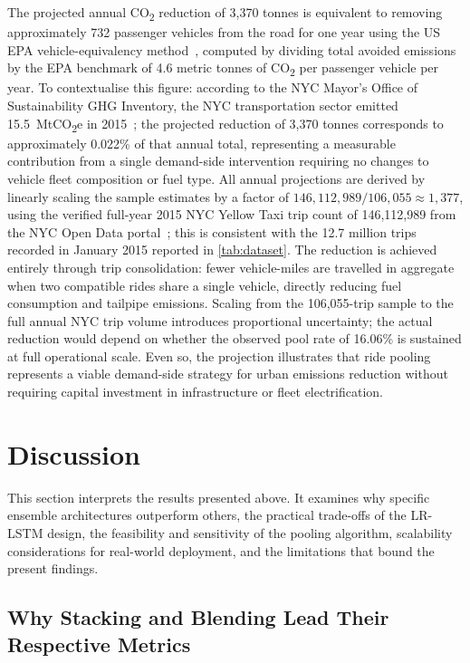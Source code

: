 The projected annual CO\textsubscript{2} reduction of 3,370 tonnes is equivalent to removing approximately 732 passenger vehicles from the road for one year using the US EPA vehicle-equivalency method~\parencite{epa_equivalencies}, computed by dividing total avoided emissions by the EPA benchmark of 4.6 metric tonnes of CO\textsubscript{2} per passenger vehicle per year. To contextualise this figure: according to the NYC Mayor's Office of Sustainability GHG Inventory, the NYC transportation sector emitted 15.5~MtCO\textsubscript{2}e in 2015~\parencite{nyc_ghg_2015}; the projected reduction of 3,370 tonnes corresponds to approximately 0.022\% of that annual total, representing a measurable contribution from a single demand-side intervention requiring no changes to vehicle fleet composition or fuel type. All annual projections are derived by linearly scaling the sample estimates by a factor of $146{,}112{,}989 / 106{,}055 \approx 1{,}377$, using the verified full-year 2015 NYC Yellow Taxi trip count of 146,112,989 from the NYC Open Data portal~\parencite{nyc_opendata_2015}; this is consistent with the 12.7 million trips recorded in January 2015 reported in \autoref{tab:dataset}. The reduction is achieved entirely through trip consolidation: fewer vehicle-miles are travelled in aggregate when two compatible rides share a single vehicle, directly reducing fuel consumption and tailpipe emissions. Scaling from the 106,055-trip sample to the full annual NYC trip volume introduces proportional uncertainty; the actual reduction would depend on whether the observed pool rate of 16.06\% is sustained at full operational scale. Even so, the projection illustrates that ride pooling represents a viable demand-side strategy for urban emissions reduction without requiring capital investment in infrastructure or fleet electrification.

\section{Discussion}
\label{sec:discussion}

This section interprets the results presented above. It examines why specific ensemble architectures outperform others, the practical trade-offs of the LR-LSTM design, the feasibility and sensitivity of the pooling algorithm, scalability considerations for real-world deployment, and the limitations that bound the present findings.

\subsection{Why Stacking and Blending Lead Their Respective Metrics}

